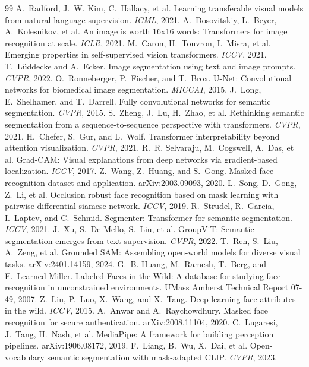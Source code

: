\documentclass[11pt,a4paper]{article}
\begin{document}
\clearpage
\begin{thebibliography}{99}\small
{} A.~Radford, J.~W. Kim, C.~Hallacy, et al. Learning transferable visual models from natural language supervision. \emph{ICML}, 2021.
 A.~Dosovitskiy, L.~Beyer, A.~Kolesnikov, et al. An image is worth 16x16 words: Transformers for image recognition at scale. \emph{ICLR}, 2021.
 M.~Caron, H.~Touvron, I.~Misra, et al. Emerging properties in self-supervised vision transformers. \emph{ICCV}, 2021.
 T.~L\"uddecke and A.~Ecker. Image segmentation using text and image prompts. \emph{CVPR}, 2022.
 O.~Ronneberger, P.~Fischer, and T.~Brox. U-Net: Convolutional networks for biomedical image segmentation. \emph{MICCAI}, 2015.
 J.~Long, E.~Shelhamer, and T.~Darrell. Fully convolutional networks for semantic segmentation. \emph{CVPR}, 2015.
 S.~Zheng, J.~Lu, H.~Zhao, et al. Rethinking semantic segmentation from a sequence-to-sequence perspective with transformers. \emph{CVPR}, 2021.
 H.~Chefer, S.~Gur, and L.~Wolf. Transformer interpretability beyond attention visualization. \emph{CVPR}, 2021.
 R.~R. Selvaraju, M.~Cogswell, A.~Das, et al. Grad-CAM: Visual explanations from deep networks via gradient-based localization. \emph{ICCV}, 2017.
 Z.~Wang, Z.~Huang, and S.~Gong. Masked face recognition dataset and application. arXiv:2003.09093, 2020.
 L.~Song, D.~Gong, Z.~Li, et al. Occlusion robust face recognition based on mask learning with pairwise differential siamese network. \emph{ICCV}, 2019.
 R.~Strudel, R.~Garcia, I.~Laptev, and C.~Schmid. Segmenter: Transformer for semantic segmentation. \emph{ICCV}, 2021.
 J.~Xu, S.~De Mello, S.~Liu, et al. GroupViT: Semantic segmentation emerges from text supervision. \emph{CVPR}, 2022.
 T.~Ren, S.~Liu, A.~Zeng, et al. Grounded SAM: Assembling open-world models for diverse visual tasks. arXiv:2401.14159, 2024.
 G.~B. Huang, M.~Ramesh, T.~Berg, and E.~Learned-Miller. Labeled Faces in the Wild: A database for studying face recognition in unconstrained environments. UMass Amherst Technical Report 07-49, 2007.
 Z.~Liu, P.~Luo, X.~Wang, and X.~Tang. Deep learning face attributes in the wild. \emph{ICCV}, 2015.
 A.~Anwar and A.~Raychowdhury. Masked face recognition for secure authentication. arXiv:2008.11104, 2020.
 C.~Lugaresi, J.~Tang, H.~Nash, et al. MediaPipe: A framework for building perception pipelines. arXiv:1906.08172, 2019.
 F.~Liang, B.~Wu, X.~Dai, et al. Open-vocabulary semantic segmentation with mask-adapted CLIP. \emph{CVPR}, 2023.
\end{thebibliography}
\end{document}
